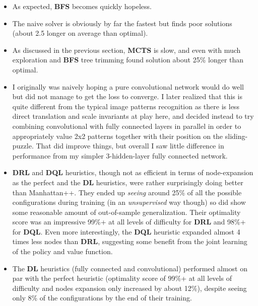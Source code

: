 \begin{itemize}
\item As expected, \textbf{BFS} becomes quickly hopeless.
\item The naive solver is obviously by far the fastest but finds poor solutions (about 2.5 longer on average than optimal).
\item As discussed in the previous section, \textbf{MCTS} is slow, and even with much exploration and \textbf{BFS} tree trimming found solution about 25\% longer than optimal.
\item I originally was naively hoping a pure convolutional network would do well but did not manage to get the loss to converge. I later realized that this is quite different from the typical image patterns recognition as there is less direct translation and scale invariants at play here, and decided instead to try combining convolutional with fully connected layers in parallel in order to appropriately value 2x2 patterns together with their position on the sliding-puzzle. That did improve things, but overall I saw little difference in performance from my simpler 3-hidden-layer fully connected network.
\item \textbf{DRL} and \textbf{DQL} heuristics, though not as efficient in terms of node-expansion as the perfect and the \textbf{DL} heuristics, were rather surprisingly doing better than Manhattan++. They ended up \textit{seeing} around 25\% of all the possible configurations during training (in an \textit{unsupervised} way though) so did show some reasonable amount of out-of-sample generalization. Their optimality score was an impressive 99\%+ at all levels of difficulty for \textbf{DRL} and 98\%+ for \textbf{DQL}. Even more interestingly, the \textbf{DQL} heuristic expanded almost 4 times less nodes than \textbf{DRL}, suggesting some benefit from the joint learning of the policy and value function.
\item The \textbf{DL} heuristics (fully connected and convolutional) performed almost on par with the perfect heuristic (optimality score of 99\%+ at all levels of difficulty and nodes expansion only increased by about 12\%), despite seeing only 8\% of the configurations by the end of their training.
\end{itemize}


